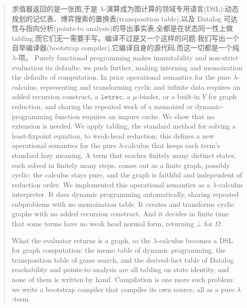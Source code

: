 \begin{CJK*}{UTF8}{gbsn}
\begin{abstract}
    求值器返回的是一张图,于是 $\lambda$-演算成为图计算的领域专用语言(DSL):动态规划的记忆表、博弈搜索的置换表(transposition table),以及 Datalog 可达性与指向分析(points-to analysis)的导出事实表,全都是在状态同一性上做 tabling,而它们无一需要手写。编译不过是又一个这样的问题:我们写出一个自举编译器(bootstrap compiler),它编译自身的源代码,而这一切都是一个纯 $\lambda$-项。
    \else
    Purely functional programming makes immutability and non-strict evaluation its defaults; we push further, making interning and memoization the defaults of computation. In prior operational semantics for the pure $\lambda$-calculus, representing and transforming cyclic and infinite data requires an added recursion construct, a $\texttt{letrec}$, a $\mu$-binder, or a built-in $Y$ for graph reduction, and sharing the repeated work of a memoized or dynamic-programming function requires an impure cache. We show that no extension is needed. We apply tabling, the standard method for solving a least-fixpoint equation, to weak-head reduction; this defines a new operational semantics for the pure $\lambda$-calculus that keeps each term's standard lazy meaning. A term that reaches finitely many distinct states, each solved in finitely many steps, comes out as a finite graph, possibly cyclic; the calculus stays pure, and the graph is faithful and independent of reduction order. We implemented this operational semantics as a $\lambda$-calculus interpreter. It does dynamic programming automatically, sharing repeated subproblems with no memoization table. It creates and transforms cyclic graphs with no added recursion construct. And it decides in finite time that some terms have no weak head normal form, returning $\bot$ for $\Omega$.

    What the evaluator returns is a graph, so the $\lambda$-calculus becomes a DSL for graph computation: the memo table of dynamic programming, the transposition table of game search, and the derived-fact table of Datalog reachability and points-to analysis are all tabling on state identity, and none of them is written by hand. Compilation is one more such problem: we write a bootstrap compiler that compiles its own source, all as a pure $\lambda$-term.
    \fi
    \ifTablambdaLNCS
    \keywords{\tablambdaKeywords{ \and}}
    \fi
  \end{abstract}

  \ifTablambdaLNCS\else


\end{CJK*}
